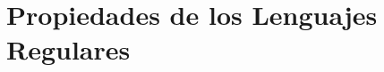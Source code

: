 \newpage
\section{Propiedades de los Lenguajes Regulares}

\begin{comment}
\begin{table}[H]
        \centering
        \begin{tabular}{r c c c c c c c}
            \hhline{~*{1}{-}}
            $q_{11}q_{20}$ & \cell{~}\\ \hhline{~*{2}{-}}
            $q_{10}q_{21}$ & \cell{~} & \cell{~}\\ \hhline{~*{3}{-}}
            $E_1q_{20}$ & \cell{~} & \cell{~} & \cell{~}\\ \hhline{~*{4}{-}}
            $E_1q_{21}$ & \cell{~} & \cell{~} & \cell{~} & \cell{~}\\ \hhline{~*{5}{-}}
            $q_{10}E_2$ & \cell{~} & \cell{~} & \cell{~} & \cell{~} & \cell{~}\\ \hhline{~*{6}{-}}
            $q_{11}E_2$ & \cell{~} & \cell{~} & \cell{~} & \cell{~} & \cell{~} & \cell{~}\\ \hhline{~*{7}{-}}
            $E_1E_2$ & \cell{~} & \cell{~} & \cell{~} & \cell{~} & \cell{~} & \cell{~} &  \cell{~}\\ \hhline{~*{7}{-}}\\
            & $q_{10}q_{20}$ & $q_{11}q_{20}$ & $q_{10}q_{21}$ & $E_1q_{20}$ & $E_1q_{21}$ & $q_{10}E_2$ & $q_{11}E_2$\\
        \end{tabular}
        \caption{Minimización del AFD de la figura~\ref{fig:1.3.8-AFD-Interseccion}.}
        \label{tab:1.3.8-Minimizacion}
    \end{table}
\end{comment}


